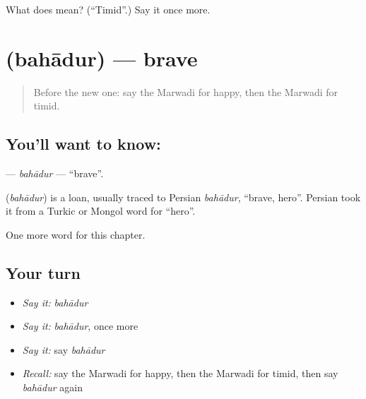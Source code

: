 \begin{tcolorbox}[breakable,colback=teal!4,colframe=teal!35!black,title={Before you move on}]
What does  mean? (\textquotedblleft{}Timid\textquotedblright{}.) Say it once more.
\end{tcolorbox}
\section[\texorpdfstring{\mw{बहादुर} (bahādur)}{बहादुर (bahādur)}]{ (bahādur) — brave}

\label{lesson:MW-C149-bahadur}



\begin{quote}
Before the new one: say the Marwadi for happy, then the Marwadi for timid.
\end{quote}

\subsection*{You'll want to know: }
\textbf{} — \emph{bahādur} — \textquotedblleft{}brave\textquotedblright{}.

\begin{cousinweb}
\textbf{} (\emph{bahādur}) is a loan, usually traced to Persian \emph{bahādur}, \textquotedblleft{}brave, hero\textquotedblright{}. Persian took it from a Turkic or Mongol word for \textquotedblleft{}hero\textquotedblright{}.
\end{cousinweb}

\begin{grammarlens}[title={What you've built}]
One more word for this chapter.
\end{grammarlens}

\subsection*{Your turn}
\begin{itemize}
\raggedright
  \item \emph{Say it:} \emph{bahādur}
  \item \emph{Say it:} \emph{bahādur}, once more
  \item \emph{Say it:} say \emph{bahādur}
  \item \emph{Recall:} say the Marwadi for happy, then the Marwadi for timid, then say \emph{bahādur} again
\end{itemize}

